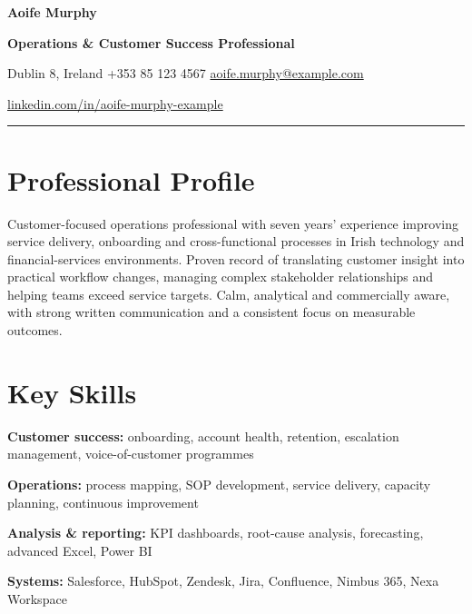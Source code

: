 \documentclass[10pt,a4paper]{article}
\newcommand{\contactsep}{\hspace{0.55em}\textcolor{rulecolour}{\textbar}\hspace{0.55em}}
\begin{document}
\thispagestyle{empty}

\begin{center}
  {\fontsize{25}{29}\selectfont\bfseries\color{navy} Aoife Murphy}\par
  \vspace{2pt}
  {\large\bfseries\color{green} Operations \& Customer Success Professional}\par
  \vspace{6pt}
  Dublin 8, Ireland
  \contactsep +353 85 123 4567
  \contactsep \href{mailto:aoife.murphy@example.com}{aoife.murphy@example.com}\par
  \vspace{2pt}
  \href{https://www.linkedin.com/in/aoife-murphy-example}{linkedin.com/in/aoife-murphy-example}
\end{center}

\vspace{2pt}
\color{green}\rule{\textwidth}{1.1pt}\color{ink}

\section{Professional Profile}

Customer-focused operations professional with seven years' experience improving service delivery, onboarding and cross-functional processes in Irish technology and financial-services environments. Proven record of translating customer insight into practical workflow changes, managing complex stakeholder relationships and helping teams exceed service targets. Calm, analytical and commercially aware, with strong written communication and a consistent focus on measurable outcomes.

\section{Key Skills}

\textbf{Customer success:} onboarding, account health, retention, escalation management, voice-of-customer programmes \par
\vspace{2pt}
\textbf{Operations:} process mapping, SOP development, service delivery, capacity planning, continuous improvement \par
\vspace{2pt}
\textbf{Analysis \& reporting:} KPI dashboards, root-cause analysis, forecasting, advanced Excel, Power BI \par
\vspace{2pt}
\textbf{Systems:} Salesforce, HubSpot, Zendesk, Jira, Confluence, Nimbus 365, Nexa Workspace
\end{document}
